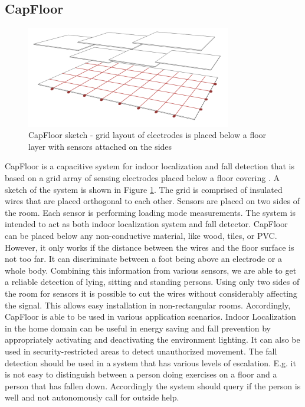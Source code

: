 \subsection{CapFloor}
\label{ch:prot_capfloor}
\begin{figure}[h]
\centering
\includegraphics[width=0.8\textwidth]{images/capfloor}
\caption{CapFloor sketch - grid layout of electrodes is placed below a floor layer with sensors attached on the sides}
\label{fig:capfloor_sketch}
\end{figure}

CapFloor is a capacitive system for indoor localization and fall detection that is based on a grid array of sensing electrodes placed below a floor covering \cite{Braun2012CapFloor}. A sketch of the system is shown in Figure \ref{fig:capfloor_sketch}. The grid is comprised of insulated wires that are placed orthogonal to each other. Sensors are placed on two sides of the room. Each sensor is performing loading mode measurements. The system is intended to act as both indoor localization system and fall detector. CapFloor can be placed below any non-conductive material, like wood, tiles, or PVC. However, it only works if the distance between the wires and the floor surface is not too far. It can discriminate between a foot being above an electrode or a whole body. Combining this information from various sensors, we are able to get a reliable detection of lying, sitting and standing persons. Using only two sides of the room for sensors it is possible to cut the wires without considerably affecting the signal. This allows easy installation in non-rectangular rooms.
Accordingly, CapFloor is able to be used in various application scenarios. Indoor Localization in the home domain can be useful in energy saving and fall prevention by appropriately activating and deactivating the environment lighting. It can also be used in security-restricted areas to detect unauthorized movement. The fall detection should be used in a system that has various levels of escalation. E.g. it is not easy to distinguish between a person doing exercises on a floor and a person that has fallen down. Accordingly the system should query if the person is well and not autonomously call for outside help.

